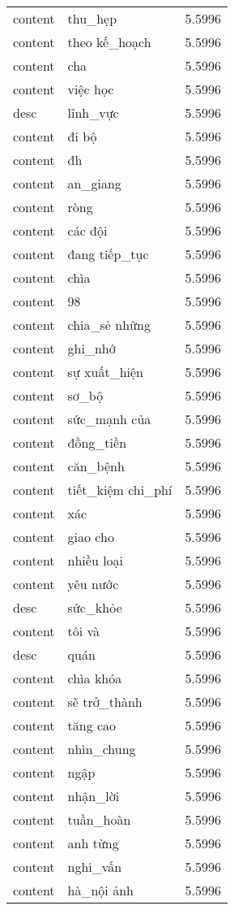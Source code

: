 \documentclass{article}
\begin{document}
\begin{tabular}{lll}
content & thu\_hẹp & 5.5996\\
content & theo kế\_hoạch & 5.5996\\
content & cha & 5.5996\\
content & việc học & 5.5996\\
desc & lĩnh\_vực & 5.5996\\
content & đi bộ & 5.5996\\
content & đh & 5.5996\\
content & an\_giang & 5.5996\\
content & ròng & 5.5996\\
content & các đội & 5.5996\\
content & đang tiếp\_tục & 5.5996\\
content & chìa & 5.5996\\
content & 98 & 5.5996\\
content & chia\_sẻ những & 5.5996\\
content & ghi\_nhớ & 5.5996\\
content & sự xuất\_hiện & 5.5996\\
content & sơ\_bộ & 5.5996\\
content & sức\_mạnh của & 5.5996\\
content & đồng\_tiền & 5.5996\\
content & căn\_bệnh & 5.5996\\
content & tiết\_kiệm chi\_phí & 5.5996\\
content & xác & 5.5996\\
content & giao cho & 5.5996\\
content & nhiều loại & 5.5996\\
content & yêu nước & 5.5996\\
desc & sức\_khỏe & 5.5996\\
content & tôi và & 5.5996\\
desc & quán & 5.5996\\
content & chìa khóa & 5.5996\\
content & sẽ trở\_thành & 5.5996\\
content & tăng cao & 5.5996\\
content & nhìn\_chung & 5.5996\\
content & ngập & 5.5996\\
content & nhận\_lời & 5.5996\\
content & tuần\_hoàn & 5.5996\\
content & anh từng & 5.5996\\
content & nghi\_vấn & 5.5996\\
content & hà\_nội ảnh & 5.5996\\

\end{tabular}
\end{document}
